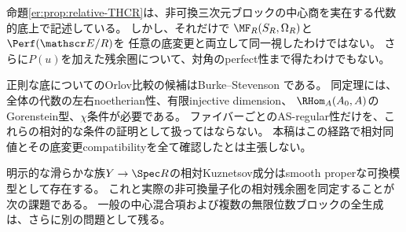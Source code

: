 \begin{remark}[証明できた相対命題と残る問題]\label{er:rem:relative-gap}
命題\ref{er:prop:relative-THCR}は、非可換三次元ブロックの中心商を実在する代数的底上で記述している。
しかし、それだけで
$\MF_R(S_R,\Omega_R)$と$\Perf(\mathscr E/R)$を
任意の底変更と両立して同一視したわけではない。
さらに$P(u)$を加えた残余圏について、対角のperfect性まで得たわけでもない。

正則な底についてのOrlov比較の候補はBurke--Stevenson
\cite[Definition 5.1, Theorem 6.4]{BurkeStevenson}である。
同定理には、全体の代数の左右noetherian性、有限injective dimension、
$\RHom_A(A_0,A)$のGorenstein型、$\chi$条件が必要である。
ファイバーごとのAS-regular性だけを、これらの相対的な条件の証明として扱ってはならない。
本稿はこの経路で相対同値とその底変更compatibilityを全て確認したとは主張しない。

明示的な滑らかな族$Y\to\Spec R$の相対Kuznetsov成分はsmooth properな可換模型として存在する。
これと実際の非可換量子化の相対残余圏を同定することが次の課題である。
一般の中心混合項および複数の無限位数ブロックの全生成は、さらに別の問題として残る。
\end{remark}